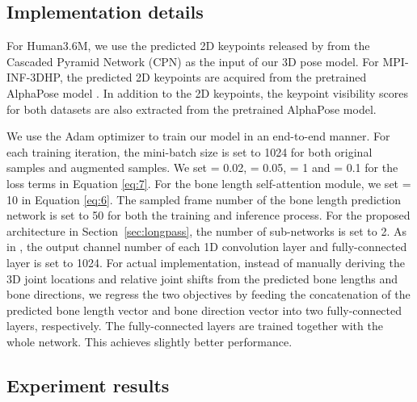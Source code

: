 \documentclass[journal]{IEEEtran}
\begin{document}
\subsection{Implementation details} \label{sec:id}

For Human3.6M, we use the predicted
2D keypoints released by \cite{pavllo20193d} from the Cascaded Pyramid Network
(CPN) as the input of our 3D pose model. For MPI-INF-3DHP, the predicted 2D keypoints are acquired from the pretrained AlphaPose model \cite{fang2017rmpe}. 
In addition to the 2D keypoints, the keypoint visibility scores for both datasets are also extracted from the pretrained AlphaPose model. 

We use the Adam optimizer to train our model in an end-to-end manner. For each training iteration, the mini-batch size is set to 1024 for both original samples and augmented samples. We set  = 0.02,  = 0.05,  = 1 and  = 0.1 for the loss terms in Equation \ref{eq:7}. For the bone length self-attention module, we set  = 10 in Equation \ref{eq:6}. The sampled frame number of the bone length prediction network  is set to 50 for both the training and inference process. For the proposed architecture in Section~\ref{sec:longpass}, the number of sub-networks is set to 2. As in \cite{pavllo20193d}, the output channel number of each 1D convolution layer and fully-connected layer is set to 1024. For actual implementation, instead of manually deriving the 3D joint locations and relative joint shifts from the predicted bone lengths and bone directions, we regress the two objectives by feeding the concatenation of the predicted bone length vector and bone direction vector into two fully-connected layers, respectively. The fully-connected layers are trained together with the whole network. This achieves slightly better performance.  

\vspace{-1mm}
\subsection{Experiment results} \label{sec:expr}
\end{document}
